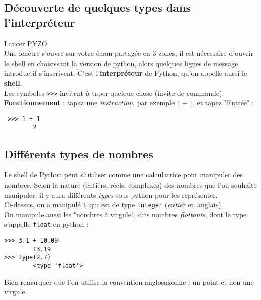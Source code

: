 \ifprof
\vspace{1cm}
\else
\begin{multicols}{2}
\fi




\subsection*{Découverte de quelques types dans l'interpréteur}
Lancer PYZO.\\
Une fenêtre s'ouvre sur votre écran partagée en 3 zones, il est nécessaire d'ouvrir le shell en choisissant la version de python, alors quelques lignes de message introductif s'inscrivent. C'est l'\textbf{interpréteur} de Python, qu'on appelle aussi le \textbf{shell}.\\
Les symboles \texttt{{>}{>}{>}} invitent à taper quelque chose (invite de commande). \\

\textbf{Fonctionnement} : tapez une \emph{instruction}, par exemple $1+1$,  et tapez "Entrée" : 

\begin{lstlisting}
 >>> 1 + 1
        2
\end{lstlisting}

\subsection*{Différents types de nombres}
Le shell de Python peut s'utiliser comme une calculatrice pour manipuler des nombres. Selon la nature (entiers, réels, complexes) des nombres que l'on souhaite manipuler, il y aura différents \emph{types} sous python pour les représenter.\\

Ci-dessus, on a manipulé \texttt{1} qui est de type \texttt{integer} (\emph{entier} en anglais).\\
On manipule aussi les "nombres à virgule", dits nombres \emph{flottants}, dont le type s'appelle \texttt{float} en python : 
\begin{lstlisting}
>>> 3.1 + 10.09
        13.19
>>> type(2.7)
        <type 'float'>
\end{lstlisting}

\begin{warn}Bien remarquer que l'on utilise la convention anglosaxonne : un point et non une virgule.\end{warn}

\exer{}~\\


\end{multicols}

